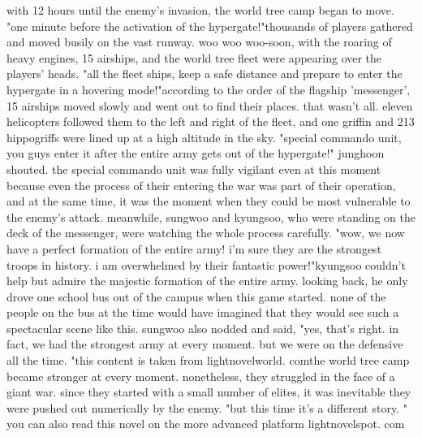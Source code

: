 with 12 hours until the enemy's invasion, the world tree camp began to move.
"one minute before the activation of the hypergate!"thousands of players gathered and moved busily on the vast runway.
woo woo woo-soon, with the roaring of heavy engines, 15 airships, and the world tree fleet were appearing over the players' heads.
"all the fleet ships, keep a safe distance and prepare to enter the hypergate in a hovering mode!"according to the order of the flagship 'messenger', 15 airships moved slowly and went out to find their places.
 that wasn't all.
 eleven helicopters followed them to the left and right of the fleet, and one griffin and 213 hippogriffs were lined up at a high altitude in the sky.
"special commando unit, you guys enter it after the entire army gets out of the hypergate!" junghoon shouted.
the special commando unit was fully vigilant even at this moment because even the process of their entering the war was part of their operation, and at the same time, it was the moment when they could be most vulnerable to the enemy's attack.
meanwhile, sungwoo and kyungsoo, who were standing on the deck of the messenger, were watching the whole process carefully.
"wow, we now have a perfect formation of the entire army! i'm sure they are the strongest troops in history.
 i am overwhelmed by their fantastic power!"kyungsoo couldn't help but admire the majestic formation of the entire army.
 looking back, he only drove one school bus out of the campus when this game started.
none of the people on the bus at the time would have imagined that they would see such a spectacular scene like this.
sungwoo also nodded and said, "yes, that's right.
 in fact, we had the strongest army at every moment.
 but we were on the defensive all the time.
"this content is taken from lightnovelworld.
c­omthe world tree camp became stronger at every moment.
 nonetheless, they struggled in the face of a giant war.
 since they started with a small number of elites, it was inevitable they were pushed out numerically by the enemy.
"but this time it's a different story.
" you can also read this novel on the more advanced platform lightnovelspot.
com

 